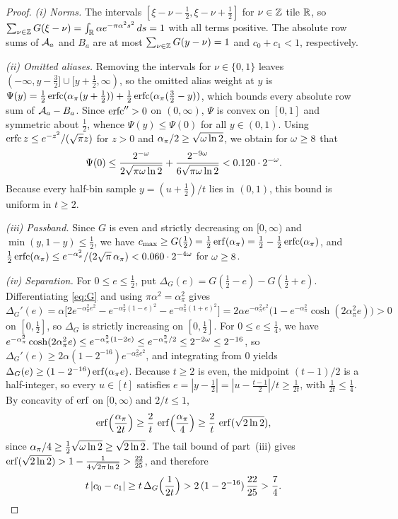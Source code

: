 \begin{proof}
\emph{(i) Norms.} The intervals $[\xi-\nu-\tfrac12,\xi-\nu+\tfrac12]$ for $\nu\in\mathbb{Z}$ tile $\mathbb{R}$, so
$\sum_{\nu\in\mathbb{Z}}G(\xi-\nu)=\int_{\mathbb{R}}\alpha e^{-\pi\alpha^2 s^2}\,ds=1$ with all terms positive. The absolute row sums of
$\mathcal{A}_a$ and $B_a$ are at most $\sum_{\nu\in\mathbb{Z}}G(y-\nu)=1$ and $c_0+c_1<1$, respectively.

\emph{(ii) Omitted aliases.} Removing the intervals for $\nu\in\{0,1\}$ leaves
$(-\infty,y-\tfrac32]\cup[y+\tfrac12,\infty)$, so the omitted alias weight at $y$ is
$\Psi(y)=\tfrac12\operatorname{erfc}(\alpha_\pi(y+\tfrac12))+\tfrac12\operatorname{erfc}(\alpha_\pi(\tfrac32-y))$, which bounds every absolute row
sum of $\mathcal{A}_a-B_a$. Since $\operatorname{erfc}''>0$ on $(0,\infty)$, $\Psi$ is convex on $[0,1]$ and symmetric about $\tfrac12$, whence
$\Psi(y)\le\Psi(0)$ for all $y\in(0,1)$. Using $\operatorname{erfc} z\le e^{-z^2}/(\sqrt\pi z)$ for $z>0$ and
$\alpha_\pi/2\ge\sqrt{\omega\ln 2}$, we obtain for $\omega\ge 8$ that
\[
  \Psi(0)\le\frac{2^{-\omega}}{2\sqrt{\pi\omega\ln 2}}+\frac{2^{-9\omega}}{6\sqrt{\pi\omega\ln 2}}<0.120\cdot 2^{-\omega}.
\]
Because every half-bin sample $y=(u+\tfrac12)/t$ lies in $(0,1)$, this bound is uniform in $t\ge 2$.

\emph{(iii) Passband.} Since $G$ is even and strictly decreasing on $[0,\infty)$ and $\min(y,1-y)\le\tfrac12$, we have
$c_{\max}\ge G(\tfrac12)=\tfrac12\operatorname{erf}(\alpha_\pi)=\tfrac12-\tfrac12\operatorname{erfc}(\alpha_\pi)$, and
$\tfrac12\operatorname{erfc}(\alpha_\pi)\le e^{-\alpha_\pi^2}/(2\sqrt\pi\,\alpha_\pi)<0.060\cdot 2^{-4\omega}$ for $\omega\ge 8$.

\emph{(iv) Separation.} For $0\le e\le\tfrac12$, put $\Delta_G(e)=G(\tfrac12-e)-G(\tfrac12+e)$. Differentiating
\eqref{eq:G} and using $\pi\alpha^2=\alpha_\pi^2$ gives
\[
  \Delta_G'(e)=\alpha\bigl[2e^{-\alpha_\pi^2 e^2}-e^{-\alpha_\pi^2(1-e)^2}-e^{-\alpha_\pi^2(1+e)^2}\bigr]
  =2\alpha e^{-\alpha_\pi^2 e^2}\bigl(1-e^{-\alpha_\pi^2}\cosh(2\alpha_\pi^2 e)\bigr)>0
\]
on $[0,\tfrac12]$, so $\Delta_G$ is strictly increasing on $[0,\tfrac12]$. For $0\le e\le\tfrac14$, we have
$e^{-\alpha_\pi^2}\cosh(2\alpha_\pi^2 e)\le e^{-\alpha_\pi^2(1-2e)}\le e^{-\alpha_\pi^2/2}\le 2^{-2\omega}\le 2^{-16}$, so
$\Delta_G'(e)\ge 2\alpha(1-2^{-16})e^{-\alpha_\pi^2 e^2}$, and integrating from $0$ yields
$\Delta_G(e)\ge(1-2^{-16})\operatorname{erf}(\alpha_\pi e)$. Because $t\ge 2$ is even, the midpoint $(t-1)/2$ is a half-integer, so
every $u\in[t]$ satisfies $e=|y-\tfrac12|=|u-\tfrac{t-1}{2}|/t\ge\frac{1}{2t}$, with $\frac{1}{2t}\le\tfrac14$. By
concavity of $\operatorname{erf}$ on $[0,\infty)$ and $2/t\le 1$,
\[
  \operatorname{erf}\Bigl(\frac{\alpha_\pi}{2t}\Bigr)\ge\frac{2}{t}\,\operatorname{erf}\Bigl(\frac{\alpha_\pi}{4}\Bigr)\ge\frac{2}{t}\,\operatorname{erf}(\sqrt{2\ln 2}),
\]
since $\alpha_\pi/4\ge\tfrac12\sqrt{\omega\ln 2}\ge\sqrt{2\ln 2}$. The tail bound of part~(iii) gives
$\operatorname{erf}(\sqrt{2\ln 2})>1-\frac{1}{4\sqrt{2\pi\ln 2}}>\frac{22}{25}$, and therefore
\[
  t\,|c_0-c_1|\ge t\,\Delta_G\Bigl(\frac{1}{2t}\Bigr)>2\,(1-2^{-16})\,\frac{22}{25}>\frac{7}{4}.
\]


\end{proof}
